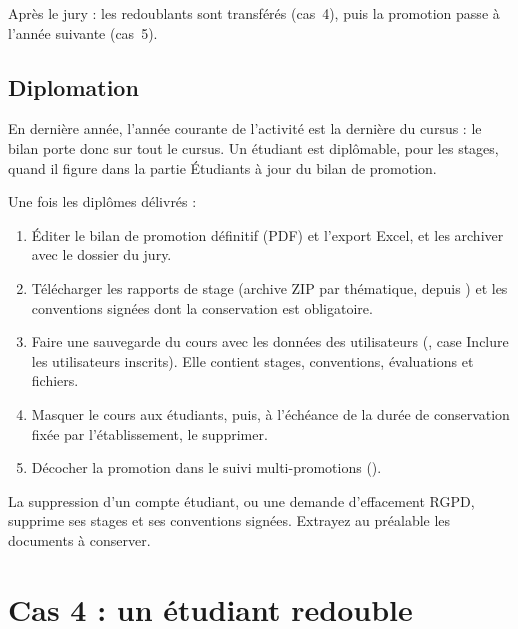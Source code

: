 \documentclass[11pt,a4paper]{article}
\begin{document}

Après le jury : les redoublants sont transférés (cas~4), puis la promotion passe
à l'année suivante (cas~5).

\subsection{Diplomation}

En dernière année, l'année courante de l'activité est la dernière du cursus : le
bilan porte donc sur tout le cursus. Un étudiant est diplômable, pour les stages,
quand il figure dans la partie \og Étudiants à jour\fg{} du bilan de promotion.

Une fois les diplômes délivrés :
\begin{enumerate}
  \item Éditer le bilan de promotion définitif (PDF) et l'export Excel, et les
        archiver avec le dossier du jury.
  \item Télécharger les rapports de stage (archive ZIP par thématique, depuis
        ) et les conventions signées dont la
        conservation est obligatoire.
  \item Faire une sauvegarde du cours avec les données des utilisateurs
        (, case
        \og Inclure les utilisateurs inscrits\fg{}). Elle contient stages,
        conventions, évaluations et fichiers.
  \item Masquer le cours aux étudiants, puis, à l'échéance de la durée de
        conservation fixée par l'établissement, le supprimer.
  \item Décocher la promotion dans le suivi multi-promotions
        ().
\end{enumerate}


\begin{attention}
La suppression d'un compte étudiant, ou une demande d'effacement RGPD, supprime
ses stages et ses conventions signées. Extrayez au préalable les documents à
conserver.
\end{attention}

\section{Cas 4 : un étudiant redouble}
\label{sec:cas4}
\end{document}
